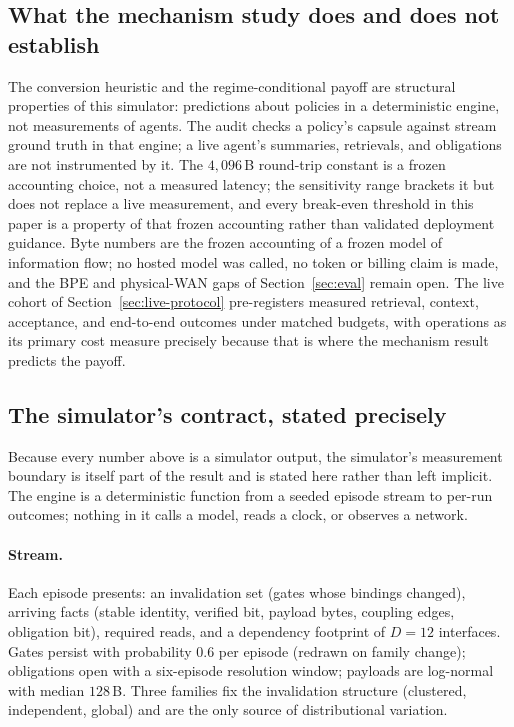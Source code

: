 \subsection{What the mechanism study does and does not
establish}\label{sec:retire-limits}
The conversion heuristic and the regime-conditional payoff are
structural properties of this simulator: predictions about policies
in a deterministic engine, not measurements of agents. The audit
checks a policy's capsule against stream ground truth in that
engine; a live agent's summaries, retrievals, and
obligations are not instrumented by it. The $4{,}096$\,B
round-trip constant is a frozen accounting choice, not a measured
latency; the sensitivity range brackets it but does not replace a live
measurement, and every break-even threshold in this paper is a
property of that frozen accounting rather than validated deployment
guidance. Byte numbers are the frozen accounting of a frozen model
of information flow; no hosted model was called, no token or billing
claim is made, and the BPE and physical-WAN gaps of
Section~\ref{sec:eval} remain open. The live cohort of
Section~\ref{sec:live-protocol} pre-registers measured retrieval,
context, acceptance, and end-to-end outcomes under matched budgets,
with operations as its
primary cost measure precisely because that is where the mechanism
result predicts the payoff.

\subsection{The simulator's contract, stated precisely}\label{sec:retire-simulator}
Because every number above is a simulator output, the simulator's
measurement boundary is itself part of the result and is stated
here rather than left implicit. The engine is a deterministic
function from a seeded episode stream to per-run outcomes; nothing
in it calls a model, reads a clock, or observes a network.

\paragraph{Stream.} Each episode presents: an invalidation set
(gates whose bindings changed), arriving facts (stable identity,
verified bit, payload bytes, coupling edges, obligation bit),
required reads, and a dependency footprint of $D{=}12$
interfaces. Gates persist with probability $0.6$ per episode
(redrawn on family change); obligations open with a six-episode
resolution window; payloads are log-normal with median $128$\,B.
Three families fix the invalidation structure (clustered,
independent, global) and are the only source of distributional
variation.

